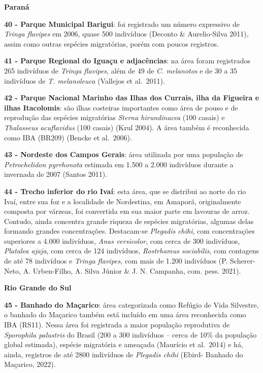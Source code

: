 \documentclass[
  oneside]{scrbook}
\begin{document}
\textbf{Paraná}

\textbf{40 - Parque Municipal Barigui}: foi registrado um número expressivo de \emph{Tringa flavipes} em 2006, quase 500 indivíduos (Deconto \& Aurelio-Silva 2011), assim como outras espécies migratórias, porém com poucos registros.

\textbf{41 - Parque Regional do Iguaçu e adjacências}: na área foram registrados 265 indivíduos de \emph{Tringa flavipes}, além de 49 de \emph{C. melanotos} e de 30 a 35 indivíduos de \emph{T. melanoleuca} (Vallejos et al.~2011).

\textbf{42 - Parque Nacional Marinho das Ilhas dos Currais, ilha da Figueira e ilhas Itacolomis}: são ilhas costeiras importantes como área de pouso e de reprodução das espécies migratórias \emph{Sterna hirundinacea} (100 casais) e \emph{Thalasseus acuflavidus} (100 casais) (Krul 2004). A área também é reconhecida como IBA (BR209) (Bencke et al.~2006).

\textbf{43 - Nordeste dos Campos Gerais}: área utilizada por uma população de \emph{Petrochelidon pyrrhonota} estimada em 1.500 a 2.000 indivíduos durante a invernada de 2007 (Santos 2011).

\textbf{44 - Trecho inferior do rio Ivaí}: esta área, que se distribui ao norte do rio Ivaí, entre sua foz e a localidade de Nordestina, em Amaporã, originalmente composta por várzeas, foi convertida em sua maior parte em lavouras de arroz. Contudo, ainda concentra grande riqueza de espécies migratórias, algumas delas formando grandes concentrações. Destacam-se \emph{Plegadis chihi}, com concentrações superiores a 4.000 indivíduos, \emph{Anas versicolor}, com cerca de 300 indivíduos, \emph{Platalea ajaja}, com cerca de 124 indivíduos, \emph{Rostrhamus sociabilis}, com contagens de até 78 indivíduos e \emph{Tringa flavipes}, com mais de 1.200 indivíduos (P. Scherer-Neto, A. Urben-Filho, A. Silva Júnior \& J. N. Campanha, com. pess. 2021).

\textbf{Rio Grande do Sul}

\textbf{45 - Banhado do Maçarico}: área categorizada como Refúgio de Vida Silvestre, o banhado do Maçarico também está incluído em uma área reconhecida como IBA (RS11). Nessa área foi registrada a maior população reprodutiva de \emph{Sporophila palustris} do Brasil (200 a 300 indivíduos -- cerca de 10\% da população global estimada), espécie migratória e ameaçada (Maurício et al.~2014) e há, ainda, registros de até 2800 indivíduos de \emph{Plegadis chihi} (Ebird- Banhado do Maçarico, 2022).
\end{document}
